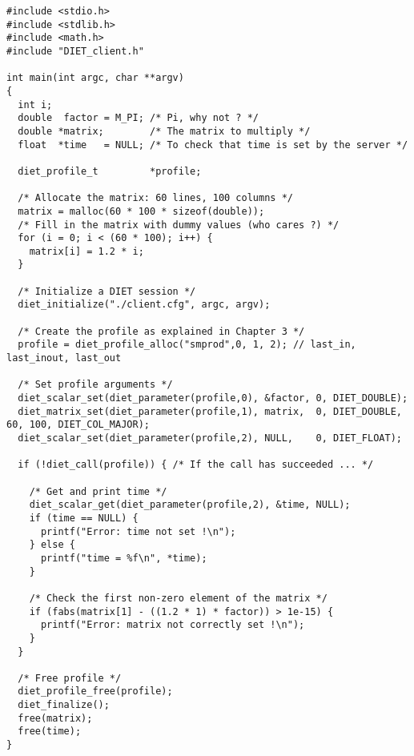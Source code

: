 {\footnotesize
\begin{verbatim}
#include <stdio.h>
#include <stdlib.h>
#include <math.h>
#include "DIET_client.h"

int main(int argc, char **argv)
{
  int i;
  double  factor = M_PI; /* Pi, why not ? */
  double *matrix;        /* The matrix to multiply */
  float  *time   = NULL; /* To check that time is set by the server */

  diet_profile_t         *profile;

  /* Allocate the matrix: 60 lines, 100 columns */
  matrix = malloc(60 * 100 * sizeof(double));
  /* Fill in the matrix with dummy values (who cares ?) */
  for (i = 0; i < (60 * 100); i++) {
    matrix[i] = 1.2 * i;
  }
  
  /* Initialize a DIET session */
  diet_initialize("./client.cfg", argc, argv);

  /* Create the profile as explained in Chapter 3 */
  profile = diet_profile_alloc("smprod",0, 1, 2); // last_in, last_inout, last_out
  
  /* Set profile arguments */
  diet_scalar_set(diet_parameter(profile,0), &factor, 0, DIET_DOUBLE);
  diet_matrix_set(diet_parameter(profile,1), matrix,  0, DIET_DOUBLE, 60, 100, DIET_COL_MAJOR);
  diet_scalar_set(diet_parameter(profile,2), NULL,    0, DIET_FLOAT);
  
  if (!diet_call(profile)) { /* If the call has succeeded ... */
     
    /* Get and print time */
    diet_scalar_get(diet_parameter(profile,2), &time, NULL);
    if (time == NULL) {
      printf("Error: time not set !\n");
    } else {
      printf("time = %f\n", *time);
    }

    /* Check the first non-zero element of the matrix */
    if (fabs(matrix[1] - ((1.2 * 1) * factor)) > 1e-15) {
      printf("Error: matrix not correctly set !\n");
    }
  }

  /* Free profile */
  diet_profile_free(profile);
  diet_finalize();
  free(matrix);
  free(time);
}
\end{verbatim}
}

